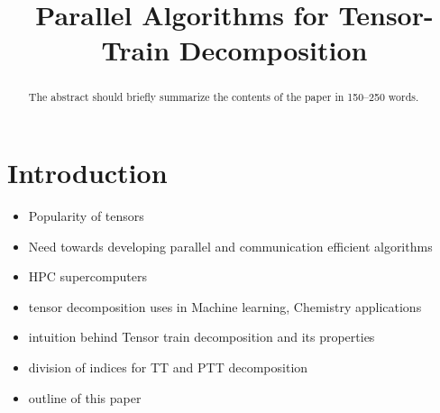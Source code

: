 \documentclass[runningheads]{llncs}
\begin{document}
%
\title{Parallel Algorithms for Tensor-Train Decomposition}
\author{}
\institute{}
\maketitle       %

\begin{abstract}
The abstract should briefly summarize the contents of the paper in
150--250 words.

\end{abstract}

\section{Introduction}
\label{sec:introduction}
\begin{itemize}
	\item Popularity of tensors
	\item Need towards developing parallel and communication efficient algorithms
	\item HPC supercomputers
	\item tensor decomposition uses in Machine learning, Chemistry applications
	\item intuition behind Tensor train decomposition and its properties
	\item division of indices for TT and PTT decomposition
	\item outline of this paper
\end{itemize}
\end{document}
